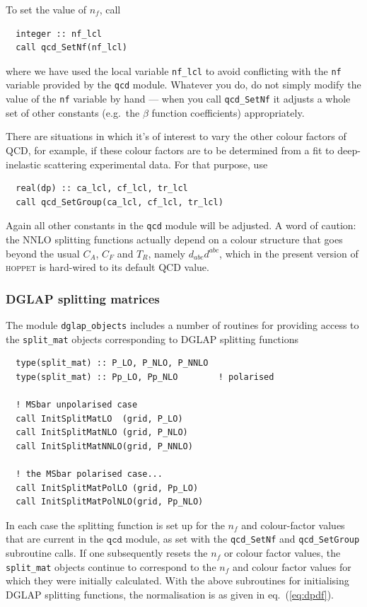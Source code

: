 \documentclass[12pt]{article}
\newcommand{\eg}{e.g.\ }
\newcommand{\hoppet}{\textsc{hoppet}\xspace}
\newcommand{\ttt}[1]{\texttt{#1}}
\begin{document}
To set the value of $n_f$, call
\begin{lstlisting}
  integer :: nf_lcl
  call qcd_SetNf(nf_lcl)  
\end{lstlisting}
where we have used the local 
variable \ttt{nf\_lcl} to avoid conflicting with
the \ttt{nf} variable provided by the \ttt{qcd} module. Whatever you
do, do not simply modify the value of the \ttt{nf} variable by hand
--- when you call \ttt{qcd\_SetNf} it adjusts a whole set of other
constants (\eg the $\beta$ function coefficients) appropriately.

There are situations in which it's of interest to vary the other
colour factors of QCD, for example, if these
colour factors are to be determined from a fit
to deep-inelastic scattering experimental data. For that purpose, use
\begin{lstlisting}
  real(dp) :: ca_lcl, cf_lcl, tr_lcl
  call qcd_SetGroup(ca_lcl, cf_lcl, tr_lcl)
\end{lstlisting}
Again all other constants in the \ttt{qcd} module will be adjusted. A
word of caution: the NNLO splitting functions actually depend on a
colour structure that goes beyond the usual $C_A$, $C_F$ and $T_R$,
namely $d_{abc}d^{abc}$, which in the present version of \hoppet
is hard-wired to its default QCD value.




\subsubsection{DGLAP splitting matrices}
\label{sec:dglap-split}

The module \ttt{dglap\_objects} includes a number of routines for
providing access to the \ttt{split\_mat} objects corresponding to
DGLAP splitting functions
\begin{lstlisting}
  type(split_mat) :: P_LO, P_NLO, P_NNLO
  type(split_mat) :: Pp_LO, Pp_NLO        ! polarised

  ! MSbar unpolarised case
  call InitSplitMatLO  (grid, P_LO)
  call InitSplitMatNLO (grid, P_NLO)
  call InitSplitMatNNLO(grid, P_NNLO)

  ! the MSbar polarised case...
  call InitSplitMatPolLO (grid, Pp_LO)
  call InitSplitMatPolNLO(grid, Pp_NLO)
\end{lstlisting}
In each case the splitting function is set up for the $n_f$ and
colour-factor values that are current in the $\ttt{qcd}$ module, as
set with the \ttt{qcd\_SetNf} and \ttt{qcd\_SetGroup} subroutine calls. If one
subsequently resets the $n_f$ or colour factor values, the \ttt{split\_mat}
objects continue to correspond to the $n_f$ and colour factor values
for which they were initially calculated.
With the above subroutines for initialising DGLAP splitting functions,
the normalisation is as given in eq.~(\ref{eq:dpdf}).
\end{document}
